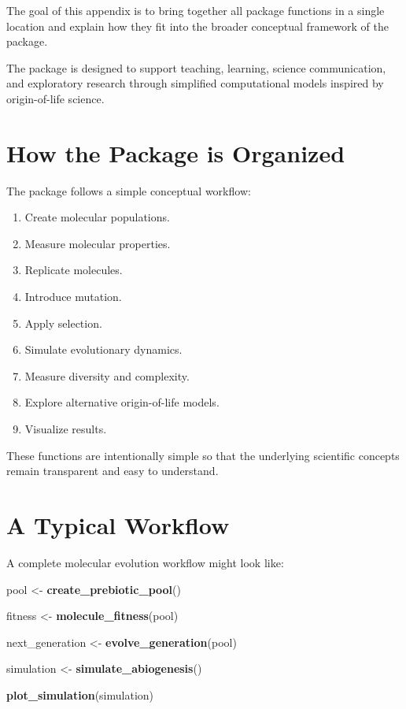 \documentclass[
  oneside,
  openany]{book}
\newenvironment{Shaded}{\begin{snugshade}}{\end{snugshade}}
\newcommand{\FunctionTok}[1]{\textcolor[rgb]{0.13,0.29,0.53}{\textbf{#1}}}
\newcommand{\NormalTok}[1]{#1}
\newcommand{\OtherTok}[1]{\textcolor[rgb]{0.56,0.35,0.01}{#1}}
\providecommand{\tightlist}{%
  \setlength{\itemsep}{0pt}\setlength{\parskip}{0pt}}
\begin{document}
The goal of this appendix is to bring together all package functions in a single location and explain how they fit into the broader conceptual framework of the package.

The package is designed to support teaching, learning, science communication, and exploratory research through simplified computational models inspired by origin-of-life science.

\section{How the Package is Organized}\label{how-the-package-is-organized}

The package follows a simple conceptual workflow:

\begin{enumerate}
\def\labelenumi{\arabic{enumi}.}
\tightlist
\item
  Create molecular populations.
\item
  Measure molecular properties.
\item
  Replicate molecules.
\item
  Introduce mutation.
\item
  Apply selection.
\item
  Simulate evolutionary dynamics.
\item
  Measure diversity and complexity.
\item
  Explore alternative origin-of-life models.
\item
  Visualize results.
\end{enumerate}

These functions are intentionally simple so that the underlying scientific concepts remain transparent and easy to understand.

\section{A Typical Workflow}\label{a-typical-workflow}

A complete molecular evolution workflow might look like:

\begin{Shaded}
\begin{Highlighting}[]
\NormalTok{pool }\OtherTok{\textless{}{-}} \FunctionTok{create\_prebiotic\_pool}\NormalTok{()}

\NormalTok{fitness }\OtherTok{\textless{}{-}} \FunctionTok{molecule\_fitness}\NormalTok{(pool)}

\NormalTok{next\_generation }\OtherTok{\textless{}{-}} \FunctionTok{evolve\_generation}\NormalTok{(pool)}

\NormalTok{simulation }\OtherTok{\textless{}{-}} \FunctionTok{simulate\_abiogenesis}\NormalTok{()}

\FunctionTok{plot\_simulation}\NormalTok{(simulation)}
\end{Highlighting}
\end{Shaded}
\end{document}

